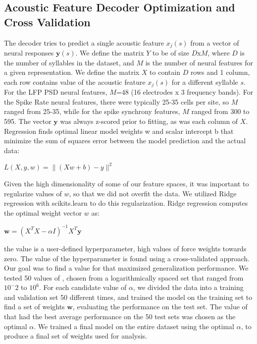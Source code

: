 \subsection{Acoustic Feature Decoder Optimization and Cross Validation}

The decoder tries to predict a single acoustic feature $x_j (s)$ from a vector of neural responses $\textbf{y}(s)$. We define the matrix $Y$ to be of size $D$x$M$, where $D$ is the number of syllables in the dataset, and $M$ is the number of neural features for a given representation. We define the matrix $X$ to contain $D$ rows and 1 column, each row contains value of the acoustic feature $x_j(s)$ for a different syllable $s$. For the LFP PSD neural features, $M$=48 (16 electrodes x 3 frequency bands). For the Spike Rate neural features, there were typically 25-35 cells per site, so $M$ ranged from 25-35, while for the spike synchrony features, $M$ ranged from 300 to 595. The vector $\textbf{y}$ was always z-scored prior to fitting, as was each column of $X$.
    Regression finds optimal linear model weights w and scalar intercept b that minimize the sum of squares error between the model prediction and the actual data:

\begin{center}
$L(X, y, w) = \| (Xw + b) - y \| ^2$
\end{center}

Given the high dimensionality of some of our feature spaces, it was important to regularize values of $w$, so that we did not overfit the data. We utilized Ridge regression with scikits.learn to do this regularization. Ridge regression computes the optimal weight vector $w$ as:

\begin{center}
$\textbf{w} = (X^T X - \alpha I)^{-1} X^T \textbf{y}$
\end{center}

the value is a user-defined hyperparameter, high values of force weights towards zero.
The value of the hyperparameter  is found using a cross-validated approach. Our goal was to find a value for that maximized generalization performance. We tested 50 values of , chosen from a logarithmically spaced set that ranged from $10^-2$ to $10^6$. For each candidate value of $\alpha$, we divided the data into a training and validation set 50 different times, and trained the model on the training set to find a set of weights $\textbf{w}$, evaluating the performance on the test set. The value of  that had the best average performance on the 50 test sets was chosen as the optimal $\alpha$. We trained a final model on the entire dataset using the optimal $\alpha$, to produce a final set of weights used for analysis.

